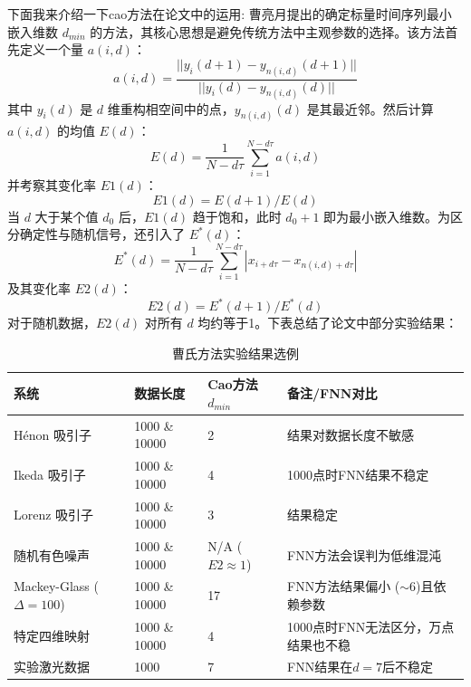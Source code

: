 下面我来介绍一下cao方法在论文中的运用:
曹亮月\cite{cao1997practical}提出的确定标量时间序列最小嵌入维数 $d_{min}$ 的方法，其核心思想是避免传统方法中主观参数的选择。该方法首先定义一个量 $a(i,d)$：
\begin{equation}
    a(i,d) = \frac{||y_i(d+1) - y_{n(i,d)}(d+1)||}{||y_i(d) - y_{n(i,d)}(d)||}
\end{equation}
其中 $y_i(d)$ 是 $d$ 维重构相空间中的点，$y_{n(i,d)}(d)$ 是其最近邻。然后计算 $a(i,d)$ 的均值 $E(d)$：
\begin{equation}
    E(d) = \frac{1}{N-d\tau}\sum_{i=1}^{N-d\tau} a(i,d)
\end{equation}
并考察其变化率 $E1(d)$：
\begin{equation}
    E1(d) = E(d+1)/E(d)
\end{equation}
当 $d$ 大于某个值 $d_0$ 后，$E1(d)$ 趋于饱和，此时 $d_0+1$ 即为最小嵌入维数。为区分确定性与随机信号，还引入了 $E^*(d)$：
\begin{equation}
    E^*(d) = \frac{1}{N-d\tau}\sum_{i=1}^{N-d\tau} |x_{i+d\tau} - x_{n(i,d)+d\tau}|
\end{equation}
及其变化率 $E2(d)$：
\begin{equation}
    E2(d) = E^*(d+1)/E^*(d)
\end{equation}
对于随机数据，$E2(d)$ 对所有 $d$ 均约等于1。下表总结了论文中部分实验结果：

\begin{table}[h!]
    \centering
    \caption{曹氏方法实验结果选例}
    \begin{tabular}{|l|l|l|l|}
        \hline
        \textbf{系统}                 & \textbf{数据长度} & \textbf{Cao方法 $d_{min}$} & \textbf{备注/FNN对比}        \\
        \hline
        Hénon 吸引子                   & 1000 \& 10000 & 2                        & 结果对数据长度不敏感               \\
        \hline
        Ikeda 吸引子                   & 1000 \& 10000 & 4                        & 1000点时FNN结果不稳定           \\
        \hline
        Lorenz 吸引子                  & 1000 \& 10000 & 3                        & 结果稳定                     \\
        \hline
        随机有色噪声                      & 1000 \& 10000 & N/A ($E2 \approx 1$)     & FNN方法会误判为低维混沌            \\
        \hline
        Mackey-Glass ($\Delta=100$) & 1000 \& 10000 & 17                       & FNN方法结果偏小 ($\sim$6)且依赖参数 \\
        \hline
        特定四维映射                      & 1000 \& 10000 & 4                        & 1000点时FNN无法区分，万点结果也不稳    \\
        \hline
        实验激光数据                      & 1000          & 7                        & FNN结果在$d=7$后不稳定          \\
        \hline
    \end{tabular}
\end{table}

